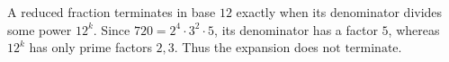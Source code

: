 A reduced fraction terminates in base $12$ exactly when its denominator divides some power $12^k$. Since $720=2^4\cdot3^2\cdot5$, its denominator has a factor $5$, whereas $12^k$ has only prime factors $2,3$. Thus the expansion does $\boxed{\text{not terminate}}$.
